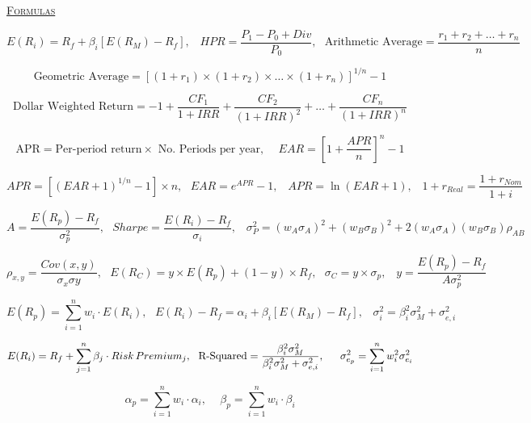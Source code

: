 
\begin{center}
	\LARGE
	\textsc{\ul{Formulas}}
\end{center}
\vspace{0.75cm}
$$E(R_{i}) = R_{f} + \beta_{i} \left[ E(R_{M}) - R_{f} \right], \,\,\,\,\, HPR = \frac{P_{1} - P_{0}+Div}{P_{0}}, \,\,\,\, \textrm{Arithmetic Average} = \frac{r_{1}+r_{2}+\dots +r_{n}}{n}$$

$$\textrm{Geometric Average} = \left[ (1+r_{1})\times (1+r_{2}) \times \dots \times (1+r_{n})\right]^{1/n}-1$$

$$\textrm{Dollar Weighted Return} = -1 + \frac{CF_{1}}{1+IRR} + \frac{CF_{2}}{(1+IRR)^{2}} + \dots + \frac{CF_{n}}{(1+IRR)^{n}} $$

$$\textrm{APR} = \textrm{Per-period return} \times \textrm{ No. Periods per year}, \,\,\,\,\,\,\, EAR = \left[ 1 + \frac{APR}{n}\right]^{n}-1$$

$$ APR = \left[ (EAR + 1)^{1/n} - 1 \right] \times n, \,\,\,\, EAR = e^{APR} - 1, \,\,\,\,\, APR = \ln (EAR + 1), \,\,\,\,\, 1+r_{Real} = \frac{1+r_{Nom}}{1+i}$$

$$ A = \frac{E(R_{p}) - R_{f}}{\sigma^{2}_{p}}, \,\,\,\, Sharpe = \frac{E(R_{i})-R_{f}}{\sigma_{i}}, \,\,\,\,\, \sigma^{2}_{P} = (w_{A}\sigma_{A})^{2} + (w_{B}\sigma_{B})^{2} + 2(w_{A}\sigma_{A})(w_{B}\sigma_{B})\rho_{AB}$$

$$\rho_{x,y} = \frac{Cov(x,y)}{\sigma_{x}\sigma{y}}, \,\,\,\, E(R_{C}) = y\times E(R_{p})+(1-y)\times R_{f}, \,\,\,\, \sigma_{C} = y \times \sigma_{p}, \,\,\,\,\, y =  \frac{E(R_{p}) - R_{f}}{A\sigma^{2}_{p}}$$

$$ E(R_{p}) = \sum_{i=1}^{n}w_{i}\cdot E(R_{i}), \,\,\,\,  E(R_{i}) - R_{f} =\alpha_{i} + \beta_{i}[E(R_{M})-R_{f}], \,\,\,\,\, \sigma^{2}_{i} = \beta^{2}_{i}\sigma^{2}_{M}+ \sigma^{2}_{e,i}$$

$$E(R_{i}) = R_{f} + \sum_{j=1}^{n}\beta_{j} \cdot Risk \, Premium_{j}, \,\,\,\, \textmd{R-Squared} = \frac{\beta^{2}_{i}\sigma^{2}_{M}}{\beta^{2}_{i}\sigma^{2}_{M}+ \sigma^{2}_{e,i}}, \,\,\,\,\,\,\,\,\, \sigma^{2}_{e_{p}} = \sum_{i=1}^{n}w^{2}_{i}\sigma^{2}_{e_{i}}$$

$$\alpha_{p} = \sum_{i=1}^{n} w_{i}\cdot \alpha_{i}, \,\,\,\,\,\,\, \beta_{p} = \sum_{i=1}^{n}w_{i}\cdot \beta_{i}$$

\vspace{1cm}
\begin{center}
	\gradetable[h][questions]
\end{center}

